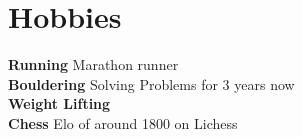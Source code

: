 \documentclass[letterpaper,11pt]{article}
\newcommand{\resumeSubHeadingListStart}{\begin{itemize}[leftmargin=0.15in, label={}]}
\newcommand{\resumeSubHeadingListEnd}{\end{itemize}}
\begin{document}
\section{Hobbies}
    \vspace{2pt}
  \resumeSubHeadingListStart
    \small{\item{
        \textbf{Running}{ Marathon runner } \\ \vspace{3pt}
        \textbf{Bouldering}{ Solving Problems for 3 years now} \\ \vspace{3pt}
        \textbf{Weight Lifting}{} \\ \vspace{3pt}
        \textbf{Chess }{ Elo of around 1800 on Lichess } \\ \vspace{3pt}
    }}
  \resumeSubHeadingListEnd



        




    
\end{document}
